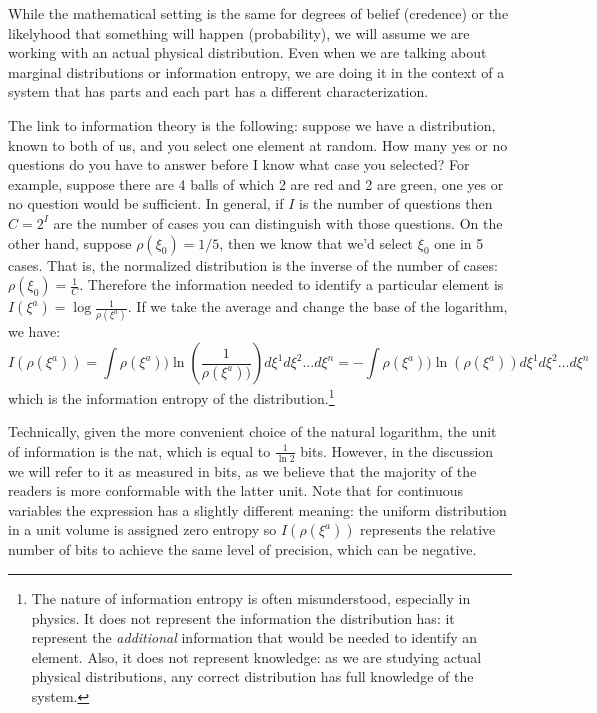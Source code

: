 \documentclass[11pt]{article}
\begin{document}
While the mathematical setting is the same for degrees of belief (credence) or the likelyhood that something will happen (probability), we will assume we are working with an actual physical distribution. Even when we are talking about marginal distributions or information entropy, we are doing it in the context of a system that has parts and each part has a different characterization.

The link to information theory is the following: suppose we have a distribution, known to both of us, and you select one element at random. How many yes or no questions do you have to answer before I know what case you selected? For example, suppose there are 4 balls of which 2 are red and 2 are green, one yes or no question would be sufficient. In general, if $I$ is the number of questions then $C = 2 ^ I$ are the number of cases you can distinguish with those questions. On the other hand, suppose $\rho(\xi_0)=1/5$, then we know that we'd select $\xi_0$ one in 5 cases. That is, the normalized distribution is the inverse of the number of cases: $\rho(\xi_0) = \frac{1}{C}$.  Therefore the information needed to identify a particular element is $I(\xi^a)=\log \frac{1}{\rho(\xi^a)}$. If we take the average and change the base of the logarithm, we have:
\begin{equation}
I(\rho(\xi^a)) = \int \rho(\xi^a)) \ln \left(\frac{1}{\rho(\xi^a))}\right) d\xi^1 d\xi^2 ... d\xi^n =-\int \rho(\xi^a)) \ln (\rho(\xi^a)) d\xi^1 d\xi^2 ... d\xi^n
\end{equation}
which is the information entropy of the distribution.\footnote{The nature of information entropy is often misunderstood, especially in physics. It does not represent the information the distribution has: it represent the \emph{additional} information that would be needed to identify an element. Also, it does not represent knowledge: as we are studying actual physical distributions, any correct distribution has full knowledge of the system.}

Technically, given the more convenient choice of the natural logarithm, the unit of information is the nat, which is equal to $\frac{1}{\ln 2}$ bits. However, in the discussion we will refer to it as measured in bits, as we believe that the majority of the readers is more conformable with the latter unit. Note that for continuous variables the expression has a slightly different meaning: the uniform distribution in a unit volume is assigned zero entropy so $I(\rho(\xi^a))$ represents the relative number of bits to achieve the same level of precision, which can be negative.
\end{document}
